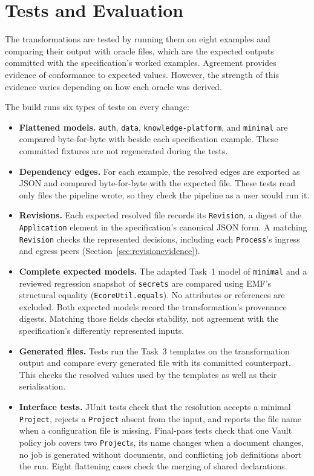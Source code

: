 \section{Tests and Evaluation}
\label{sec:evaluation}

The transformations are tested by running them on eight examples and comparing
their output with oracle files, which are the expected outputs committed with the
specification's worked examples. Agreement provides evidence of conformance to expected values. However, the strength of this evidence varies depending on how each oracle was derived.

The build runs six types of tests on every change:

\begin{itemize}
  \item \textbf{Flattened models.} \texttt{auth}, \texttt{data},
    \texttt{knowledge-platform}, and \texttt{minimal} are compared byte-for-byte
    with  beside each specification example.
    These committed fixtures are not regenerated during the tests.
  \item \textbf{Dependency edges.} For each example, the resolved edges are
    exported as JSON and compared byte-for-byte with the expected file. These
    tests read only files the pipeline wrote, so they check the pipeline as a
    user would run it.
  \item \textbf{Revisions.} Each expected resolved file records its
    \texttt{Revision}, a digest of the \texttt{Application} element in
    the specification's canonical JSON form. A matching \texttt{Revision}
    checks the represented decisions, including each \texttt{Process}'s
    ingress and egress peers (Section~\ref{sec:revisionevidence}).
  \item \textbf{Complete expected models.} The adapted Task~1 model of
    \texttt{minimal} and a reviewed regression snapshot of \texttt{secrets}
    are compared using EMF's structural equality
    (\texttt{EcoreUtil.equals}). No attributes or references are excluded.
    Both expected models record the transformation's provenance digests.
    Matching those fields checks stability, not agreement with the
    specification's differently represented inputs.
  \item \textbf{Generated files.} Tests run the Task~3 templates on the
    transformation output and compare every generated file with its committed
    counterpart. This checks the resolved values used by the templates as
    well as their serialisation.
  \item \textbf{Interface tests.} JUnit tests check that the resolution
    accepts a minimal \texttt{Project}, rejects a \texttt{Project} absent
    from the input, and reports the file name when a configuration file is
    missing. Final-pass tests check that one Vault policy job covers two
    \texttt{Project}s, its name changes when a document changes, no job is
    generated without documents, and conflicting job definitions abort the
    run. Eight flattening cases check the merging of shared declarations.
\end{itemize}

